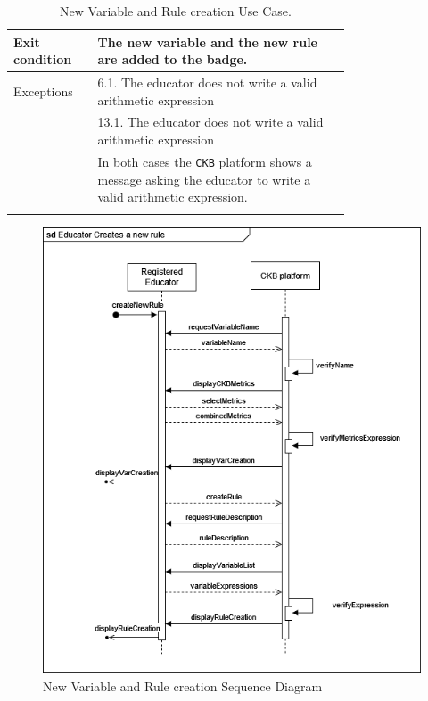 \begin{center}
\begin{longtable}{lp{0.75\linewidth}}
        \hline
        Exit condition   & The new variable and the new rule are added to the badge.   \\   
        \hline
        Exceptions
        & 6.1. The educator does not write a valid arithmetic expression\\
        & 13.1. The educator does not write a valid arithmetic expression\\
            & In both cases the \verb|CKB| platform shows a message asking the educator to write a valid arithmetic expression.  \\
        \caption{New Variable and Rule creation Use Case.}
        \label{tab: rule_variable_use_case}
    \end{longtable}

    \begin{figure} [H]
        \begin{center}
            \includegraphics[width=0.9\linewidth]{Images/SequenceDiagrams/SD_15.png}
            \caption{New Variable and Rule creation Sequence Diagram}
            \label{fig: rule_variable_seq_diag}
        \end{center}
    \end{figure}
\end{center}



